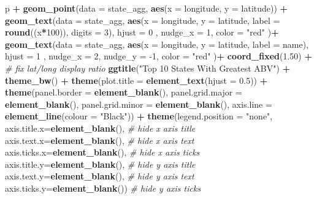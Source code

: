 \documentclass[
]{article}
\newenvironment{Shaded}{\begin{snugshade}}{\end{snugshade}}
\newcommand{\CommentTok}[1]{\textcolor[rgb]{0.56,0.35,0.01}{\textit{#1}}}
\newcommand{\DataTypeTok}[1]{\textcolor[rgb]{0.13,0.29,0.53}{#1}}
\newcommand{\DecValTok}[1]{\textcolor[rgb]{0.00,0.00,0.81}{#1}}
\newcommand{\FloatTok}[1]{\textcolor[rgb]{0.00,0.00,0.81}{#1}}
\newcommand{\KeywordTok}[1]{\textcolor[rgb]{0.13,0.29,0.53}{\textbf{#1}}}
\newcommand{\NormalTok}[1]{#1}
\newcommand{\OperatorTok}[1]{\textcolor[rgb]{0.81,0.36,0.00}{\textbf{#1}}}
\newcommand{\StringTok}[1]{\textcolor[rgb]{0.31,0.60,0.02}{#1}}
\begin{document}
\begin{Shaded}
\begin{Highlighting}[]
\NormalTok{p }\OperatorTok{+}\StringTok{ }\KeywordTok{geom_point}\NormalTok{(}\DataTypeTok{data =}\NormalTok{ state_agg, }\KeywordTok{aes}\NormalTok{(}\DataTypeTok{x =}\NormalTok{ longitude, }\DataTypeTok{y =}\NormalTok{ latitude)) }\OperatorTok{+}\StringTok{ }\KeywordTok{geom_text}\NormalTok{(}\DataTypeTok{data =}\NormalTok{ state_agg, }\KeywordTok{aes}\NormalTok{(}\DataTypeTok{x =}\NormalTok{ longitude, }\DataTypeTok{y =}\NormalTok{ latitude, }\DataTypeTok{label =} \KeywordTok{round}\NormalTok{((x}\OperatorTok{*}\DecValTok{100}\NormalTok{)), }\DataTypeTok{digits =} \DecValTok{3}\NormalTok{), }\DataTypeTok{hjust =} \DecValTok{0}\NormalTok{ , }\DataTypeTok{nudge_x =} \DecValTok{1}\NormalTok{, }\DataTypeTok{color =} \StringTok{"red"}\NormalTok{ )}\OperatorTok{+}
\StringTok{   }\KeywordTok{geom_text}\NormalTok{(}\DataTypeTok{data =}\NormalTok{ state_agg, }\KeywordTok{aes}\NormalTok{(}\DataTypeTok{x =}\NormalTok{ longitude, }\DataTypeTok{y =}\NormalTok{ latitude, }\DataTypeTok{label =}\NormalTok{ name), }\DataTypeTok{hjust =} \DecValTok{1}\NormalTok{ , }\DataTypeTok{nudge_x =} \DecValTok{2}\NormalTok{, }\DataTypeTok{nudge_y =} \DecValTok{-1}\NormalTok{, }\DataTypeTok{color =} \StringTok{"red"}\NormalTok{ )}\OperatorTok{+}
\StringTok{  }\KeywordTok{coord_fixed}\NormalTok{(}\FloatTok{1.50}\NormalTok{) }\OperatorTok{+}\StringTok{ }\CommentTok{# fix lat/long display ratio}
\StringTok{  }\KeywordTok{ggtitle}\NormalTok{(}\StringTok{"Top 10 States With Greatest ABV"}\NormalTok{) }\OperatorTok{+}\StringTok{ }\KeywordTok{theme_bw}\NormalTok{() }\OperatorTok{+}\StringTok{ }\KeywordTok{theme}\NormalTok{(}\DataTypeTok{plot.title =} \KeywordTok{element_text}\NormalTok{(}\DataTypeTok{hjust =} \FloatTok{0.5}\NormalTok{)) }\OperatorTok{+}\StringTok{  }\KeywordTok{theme}\NormalTok{(}\DataTypeTok{panel.border =} \KeywordTok{element_blank}\NormalTok{(), }\DataTypeTok{panel.grid.major =} \KeywordTok{element_blank}\NormalTok{(), }\DataTypeTok{panel.grid.minor =} \KeywordTok{element_blank}\NormalTok{(), }\DataTypeTok{axis.line =} \KeywordTok{element_line}\NormalTok{(}\DataTypeTok{colour =} \StringTok{"Black"}\NormalTok{)) }\OperatorTok{+}\StringTok{ }
\StringTok{  }\KeywordTok{theme}\NormalTok{(}\DataTypeTok{legend.position =} \StringTok{"none"}\NormalTok{,}
        \DataTypeTok{axis.title.x=}\KeywordTok{element_blank}\NormalTok{(), }\CommentTok{# hide x axis title}
        \DataTypeTok{axis.text.x=}\KeywordTok{element_blank}\NormalTok{(),  }\CommentTok{# hide x axis text}
        \DataTypeTok{axis.ticks.x=}\KeywordTok{element_blank}\NormalTok{(), }\CommentTok{# hide x axis ticks}
        \DataTypeTok{axis.title.y=}\KeywordTok{element_blank}\NormalTok{(), }\CommentTok{# hide y axis title}
        \DataTypeTok{axis.text.y=}\KeywordTok{element_blank}\NormalTok{(),  }\CommentTok{# hide y axis text}
        \DataTypeTok{axis.ticks.y=}\KeywordTok{element_blank}\NormalTok{()) }\CommentTok{# hide y axis ticks}
\end{Highlighting}
\end{Shaded}
\end{document}
